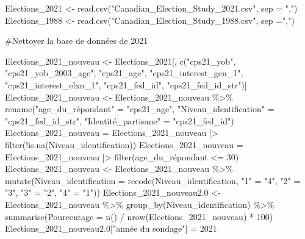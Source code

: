 \documentclass[
  letterpaper,
  DIV=11,
  numbers=noendperiod]{scrartcl}
\newenvironment{Shaded}{\begin{snugshade}}{\end{snugshade}}
\newcommand{\AttributeTok}[1]{\textcolor[rgb]{0.40,0.45,0.13}{#1}}
\newcommand{\CommentTok}[1]{\textcolor[rgb]{0.37,0.37,0.37}{#1}}
\newcommand{\DecValTok}[1]{\textcolor[rgb]{0.68,0.00,0.00}{#1}}
\newcommand{\FloatTok}[1]{\textcolor[rgb]{0.68,0.00,0.00}{#1}}
\newcommand{\FunctionTok}[1]{\textcolor[rgb]{0.28,0.35,0.67}{#1}}
\newcommand{\NormalTok}[1]{\textcolor[rgb]{0.00,0.23,0.31}{#1}}
\newcommand{\OtherTok}[1]{\textcolor[rgb]{0.00,0.23,0.31}{#1}}
\newcommand{\SpecialCharTok}[1]{\textcolor[rgb]{0.37,0.37,0.37}{#1}}
\newcommand{\StringTok}[1]{\textcolor[rgb]{0.13,0.47,0.30}{#1}}
\begin{document}
\begin{Shaded}
\begin{Highlighting}[]
\NormalTok{Elections\_2021 }\OtherTok{\textless{}{-}} \FunctionTok{read.csv}\NormalTok{(}\StringTok{"Canadian\_Election\_Study\_2021.csv"}\NormalTok{, }\AttributeTok{sep =} \StringTok{","}\NormalTok{)}
\NormalTok{Elections\_1988 }\OtherTok{\textless{}{-}} \FunctionTok{read.csv}\NormalTok{(}\StringTok{"Canadian\_Election\_Study\_1988.csv"}\NormalTok{, }\AttributeTok{sep =}\StringTok{","}\NormalTok{)}

\CommentTok{\#Nettoyer la base de données de 2021}

\NormalTok{Elections\_2021\_nouveau }\OtherTok{\textless{}{-}}\NormalTok{ Elections\_2021[, }\FunctionTok{c}\NormalTok{(}\StringTok{"cps21\_yob"}\NormalTok{, }\StringTok{"cps21\_yob\_2003\_age"}\NormalTok{, }\StringTok{"cps21\_age"}\NormalTok{, }\StringTok{"cps21\_interest\_gen\_1"}\NormalTok{, }\StringTok{"cps21\_interest\_elxn\_1"}\NormalTok{, }\StringTok{"cps21\_fed\_id"}\NormalTok{, }\StringTok{"cps21\_fed\_id\_str"}\NormalTok{)]}
\NormalTok{Elections\_2021\_nouveau }\OtherTok{\textless{}{-}}\NormalTok{ Elections\_2021\_nouveau }\SpecialCharTok{\%\textgreater{}\%} \FunctionTok{rename}\NormalTok{(}\StringTok{"age\_du\_répondant"} \OtherTok{=} \StringTok{"cps21\_age"}\NormalTok{, }\StringTok{"Niveau\_identification"} \OtherTok{=} \StringTok{"cps21\_fed\_id\_str"}\NormalTok{, }\StringTok{"Identité\_partisane"} \OtherTok{=} \StringTok{"cps21\_fed\_id"}\NormalTok{)}
\NormalTok{Elections\_2021\_nouveau }\OtherTok{=}\NormalTok{ Elections\_2021\_nouveau }\SpecialCharTok{|\textgreater{}} \FunctionTok{filter}\NormalTok{(}\SpecialCharTok{!}\FunctionTok{is.na}\NormalTok{(Niveau\_identification))}
\NormalTok{Elections\_2021\_nouveau }\OtherTok{=}\NormalTok{ Elections\_2021\_nouveau }\SpecialCharTok{|\textgreater{}} \FunctionTok{filter}\NormalTok{(age\_du\_répondant }\SpecialCharTok{\textless{}=} \DecValTok{30}\NormalTok{)}
\NormalTok{Elections\_2021\_nouveau }\OtherTok{\textless{}{-}}\NormalTok{ Elections\_2021\_nouveau }\SpecialCharTok{\%\textgreater{}\%} \FunctionTok{mutate}\NormalTok{(}\AttributeTok{Niveau\_identification =} \FunctionTok{recode}\NormalTok{(Niveau\_identification, }\StringTok{"1"} \OtherTok{=} \StringTok{"4"}\NormalTok{, }\StringTok{"2"} \OtherTok{=} \StringTok{"3"}\NormalTok{, }\StringTok{"3"} \OtherTok{=} \StringTok{"2"}\NormalTok{, }\StringTok{"4"} \OtherTok{=} \StringTok{"1"}\NormalTok{))}
\NormalTok{Elections\_2021\_nouveau2}\FloatTok{.0} \OtherTok{\textless{}{-}}\NormalTok{ Elections\_2021\_nouveau }\SpecialCharTok{\%\textgreater{}\%} \FunctionTok{group\_by}\NormalTok{(Niveau\_identification) }\SpecialCharTok{\%\textgreater{}\%} \FunctionTok{summarise}\NormalTok{(}\AttributeTok{Pourcentage =} \FunctionTok{n}\NormalTok{() }\SpecialCharTok{/} \FunctionTok{nrow}\NormalTok{(Elections\_2021\_nouveau) }\SpecialCharTok{*} \DecValTok{100}\NormalTok{)}
\NormalTok{Elections\_2021\_nouveau2}\FloatTok{.0}\NormalTok{[}\StringTok{"année du sondage"}\NormalTok{] }\OtherTok{=} \DecValTok{2021}


\end{Highlighting}
\end{Shaded}
\end{document}
